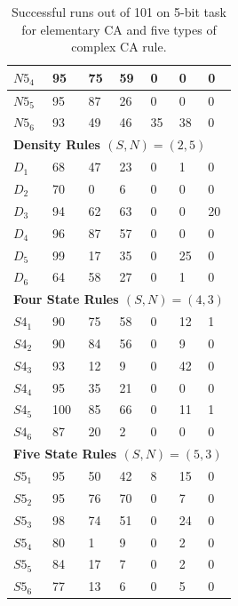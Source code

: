 \documentclass{elsarticle}
\begin{document}
\begin{multicols}{2}
\begin{table}[!htbp]
\begin{tabular}{|l|l|l|l|l|l|l|}
$N5_{4}$ & 95 & 75 & 59 & 0 & 0 & 0 \\ \hline
$N5_{5}$ & 95 & 87 & 26 & 0 & 0 & 0 \\ \hline
$N5_{6}$ & 93 & 49 & 46 & 35 & 38 & 0  \\ \hline
\multicolumn{7}{|l|}{\textbf{Density Rules \boldmath$(S,N) = (2,5)$}} \\ \hline
$D_{1}$ & 68 & 47 & 23 & 0 & 1 & 0  \\ \hline
$D_{2}$ & 70 & 0 & 6 & 0 & 0 & 0 \\ \hline
$D_{3}$ & 94 & 62 & 63 & 0 & 0 & 20 \\ \hline
$D_{4}$ & 96 & 87 & 57 & 0 & 0 & 0 \\ \hline
$D_{5}$ & 99 & 17 & 35 & 0 & 25 & 0 \\ \hline
$D_{6}$ & 64 & 58 & 27 & 0 & 1 & 0 \\ \hline
\multicolumn{7}{|l|}{\textbf{Four State Rules \boldmath$(S,N) = (4,3)$}} \\ 
\hline
$S4_{1}$ & 90 & 75 & 58 & 0 & 12  & 1 \\ \hline
$S4_{2}$ & 90 & 84 & 56 & 0 & 9 & 0  \\ \hline
$S4_{3}$ & 93 & 12 & 9 & 0 & 42 & 0 \\ \hline
$S4_{4}$ & 95 & 35 & 21 & 0 & 0 & 0 \\ \hline
$S4_{5}$ & 100 & 85 & 66 & 0 & 11 & 1 \\ \hline
$S4_{6}$ & 87 & 20 & 2 & 0 & 0 & 0 \\ \hline
\multicolumn{7}{|l|}{\textbf{Five State Rules \boldmath$(S,N) = (5,3)$}} \\ 
\hline
$S5_{1}$ & 95 & 50 & 42 & 8 & 15 & 0 \\ \hline
$S5_{2}$ & 95 & 76 & 70 & 0 & 7 & 0 \\ \hline
$S5_{3}$ & 98 & 74 & 51 & 0 & 24 & 0 \\ \hline
$S5_{4}$ & 80 & 1 & 9 & 0 & 2 & 0 \\ \hline
$S5_{5}$ & 84 & 17 & 7 & 0 & 2 & 0 \\ \hline
$S5_{6}$ & 77 & 13 & 6 & 0 & 5 & 0 \\ \hline
\end{tabular}
\caption{Successful runs out of 101 on 5-bit task for elementary CA and five 
    types of complex CA rule.}
\label{table:results}
\end{table}




\end{multicols}
\end{document}
